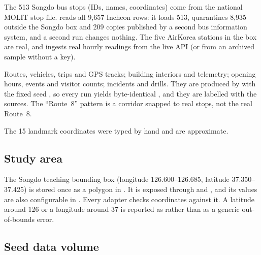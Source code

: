 \documentclass[11pt,a4paper]{article}
\begin{document}
\begin{description}[leftmargin=0pt,style=nextline]
  \item[Real.] The 513 Songdo bus stops (IDs, names, coordinates) come from the national
    MOLIT stop file.  reads all 9,657 Incheon rows: it
    loads 513, quarantines 8,935 outside the Songdo box and 209 copies published by a second
    bus information system, and a second run changes nothing. The five AirKorea stations
    in the box are real, and  ingests real hourly readings
    from the live API (or from an archived sample without a key).
  \item[Generated.] Routes, vehicles, trips and GPS tracks; building interiors and
    telemetry; opening hours, events and visitor counts; incidents and drills. They are
    produced by  with the fixed seed , so
    every run yields byte-identical , and they are labelled with the
     sources. The ``Route~8'' pattern is a corridor snapped to real stops, not
    the real Route~8.
  \item[Curated.] The 15 landmark coordinates were typed by hand and are approximate.
\end{description}

\subsection{Study area}

The Songdo teaching bounding box (longitude 126.600--126.685, latitude 37.350--37.425) is
stored once as a polygon in . It is exposed through
 and , and its values are also
configurable in . Every adapter checks coordinates against it. A latitude
around 126 or a longitude around 37 is reported as  rather than
as a generic out-of-bounds error.

\subsection{Seed data volume}
\end{document}
